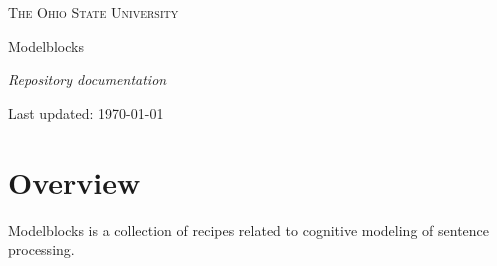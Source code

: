 \documentclass[12pt]{report}
\newcommand{\tuple}[1]{\langle #1 \rangle}
\def\blue{\color{blue}}
\begin{document}
\begin{titlepage}
      \centering\sffamily
      {\scshape\large The Ohio State University \par}
      \vspace{3cm}
      {\Huge Modelblocks\par}
      \vspace{2cm}
      {\large\itshape Repository documentation\par}
      \vfill
      {\normalsize Last updated: \today\par}
\end{titlepage}

\newcommand{\dtype}[1]{{\blue\tuple{\text{\em #1}}}}
\newcommand{\dexpr}[1]{{\blue\tuple{\text{\tt #1}}}}
\newcommand{\dcode}[1]{{\blue\text{`{\tt #1}'}}}
\newcommand{\dvar}[1]{{\blue\tuple{#1}}}

\bigskip

\tableofcontents




\chapter{Overview}

Modelblocks is a collection of recipes related to cognitive modeling of sentence processing.
\end{document}
